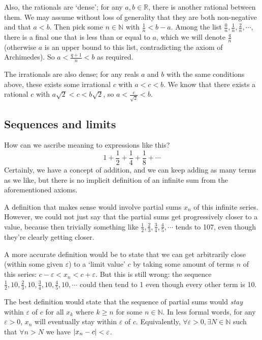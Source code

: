 Also, the rationals are `dense'; for any \(a, b \in \mathbb R\), there is another rational between them.
We may assume without loss of generality that they are both non-negative and that \(a<b\).
Then pick some \(n \in \mathbb N\) with \(\frac{1}{n} < b-a\).
Among the list \(\frac{0}{n}, \frac{1}{n}, \frac{2}{n}, \cdots\), there is a final one that is less than or equal to \(a\), which we will denote \(\frac{q}{n}\) (otherwise \(a\) is an upper bound to this list, contradicting the axiom of Archimedes).
So \(a < \frac{q + 1}{n} < b\) as required.

The irrationals are also dense; for any reals \(a\) and \(b\) with the same conditions above, these exists some irrational \(c\) with \(a<c<b\).
We know that there exists a rational \(c\) with \(a\sqrt{2} < c < b\sqrt{2}\), so \(a < \frac{c}{\sqrt{2}} < b\).

\subsection{Sequences and limits}
How can we ascribe meaning to expressions like this?
\[
	1 + \frac{1}{2} + \frac{1}{4} + \frac{1}{8} + \cdots
\]
Certainly, we have a concept of addition, and we can keep adding as many terms as we like, but there is no implicit definition of an infinite sum from the aforementioned axioms.

A definition that makes sense would involve partial sums \(x_n\) of this infinite series.
However, we could not just say that the partial sums get progressively closer to a value, because then trivially something like \(\frac{1}{2}, \frac{2}{3}, \frac{3}{4}, \frac{4}{5}, \cdots\) tends to 107, even though they're clearly getting closer.

A more accurate definition would be to state that we can get arbitrarily close (within some given \(\varepsilon\)) to a `limit value' \(c\) by taking some amount of terms \(n\) of this series: \(c - \varepsilon < x_n < c + \varepsilon\).
But this is still wrong: the sequence \(\frac{1}{2}, 10, \frac{2}{3}, 10, \frac{3}{4}, 10, \frac{4}{5}, 10, \cdots\) could then tend to 1 even though every other term is 10.

The best definition would state that the sequence of partial sums would \textit{stay} within \(\varepsilon\) of \(c\) for all \(x_k\) where \(k \geq n\) for some \(n \in \mathbb N\).
In less formal words, for any \(\varepsilon > 0\), \(x_n\) will eventually stay within \(\varepsilon\) of \(c\).
Equivalently, \(\forall \varepsilon > 0, \exists N \in \mathbb N\) such that \(\forall n > N\) we have \(\abs{x_n - c} < \varepsilon\).

